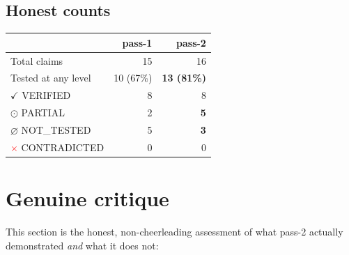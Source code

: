 \documentclass[11pt]{article}
\begin{document}
\subsection*{Honest counts}

\begin{center}
\begin{tabular}{lrr}
\toprule
                     & pass-1 & pass-2 \\
\midrule
Total claims         & 15  & 16  \\
Tested at any level  & 10 (67\%) & \textbf{13 (81\%)} \\
$\checkmark$ VERIFIED   & 8  & 8  \\
$\odot$ PARTIAL         & 2  & \textbf{5} \\
$\varnothing$ NOT\_TESTED & 5 & \textbf{3} \\
\textcolor{red}{$\times$} CONTRADICTED & 0 & 0 \\
\bottomrule
\end{tabular}
\end{center}

\section{Genuine critique}

This section is the honest, non-cheerleading assessment of what pass-2 actually
demonstrated \emph{and} what it does not:
\end{document}
